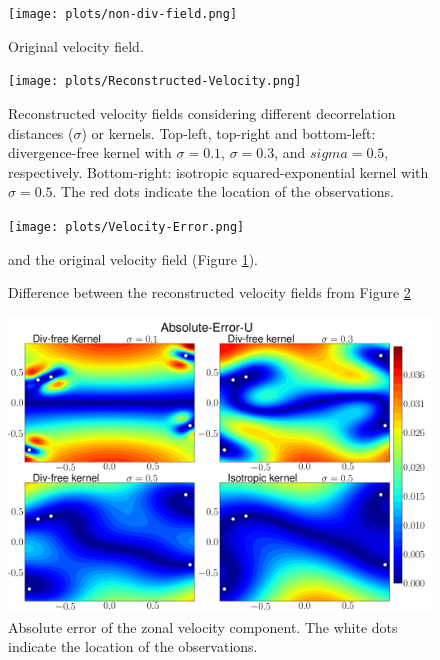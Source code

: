 \documentclass[12pt,a4paper]{article}%
\begin{document}
\begin{figure}
\centering\texttt{[image: plots/non-div-field.png]}
\caption{Original velocity field.}
\label{div-free-field}
\end{figure}



\begin{figure}
\noindent\texttt{[image: plots/Reconstructed-Velocity.png]}
\caption{Reconstructed velocity fields considering different decorrelation 
distances ($\sigma$) or kernels. Top-left, top-right and bottom-left: 
divergence-free kernel with $\sigma=0.1$, $\sigma=0.3$, and $sigma=0.5$, 
respectively. Bottom-right: isotropic squared-exponential kernel with 
$\sigma=0.5$. The red dots indicate the location of the observations.}
\label{vel_vectors}
\end{figure}

\begin{figure}
\noindent\texttt{[image: plots/Velocity-Error.png]}
\caption{Difference between the reconstructed velocity fields from Figure 
\ref{vel_vectors}} and the original velocity field (Figure \ref{div-free-field}).

\label{vel_errors}
\end{figure}


\begin{figure}
\noindent\includegraphics[width=36pc]{plots/Absolute-Error-U-contour.png}
\caption{Absolute error of the zonal velocity component. The white 
dots indicate the location of the observations.}
\label{contour_u}
\end{figure}
\end{document}
